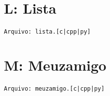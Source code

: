 \documentclass[12pt,oneside]{article} %
\begin{document}
\newpage
\section*{L: Lista } %
\vspace{-0.52cm}
\noindent \begin{verbatim}Arquivo: lista.[c|cpp|py]\end{verbatim}


\newpage
\section*{M: Meuzamigo } %
\vspace{-0.52cm}
\noindent \begin{verbatim}Arquivo: meuzamigo.[c|cpp|py]\end{verbatim}

\end{document}
